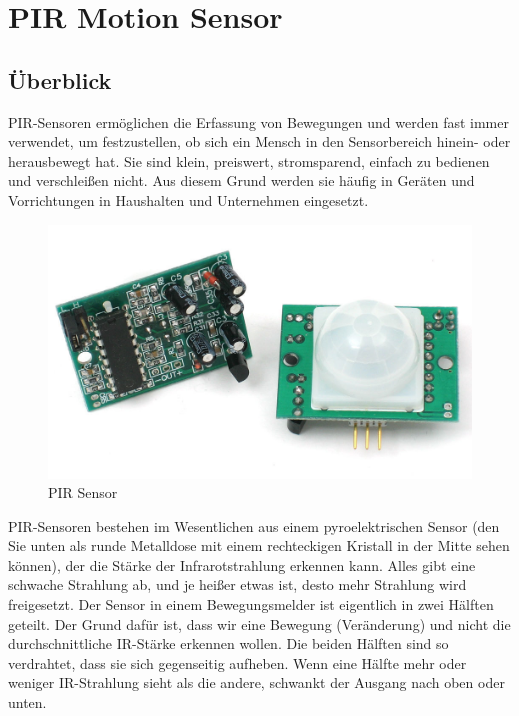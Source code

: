 \documentclass[conference]{IEEEtran}
\begin{document}
\section{PIR Motion Sensor}
\subsection{Überblick}
PIR-Sensoren ermöglichen die Erfassung von Bewegungen und werden fast immer verwendet, um festzustellen, ob sich ein Mensch in den Sensorbereich hinein- oder herausbewegt hat. Sie sind klein, preiswert, stromsparend, einfach zu bedienen und verschleißen nicht. Aus diesem Grund werden sie häufig in Geräten und Vorrichtungen in Haushalten und Unternehmen eingesetzt. 
	
\begin{figure}[h]
	\begin{center}
		\includegraphics[scale=0.15]{pir1}
	\end{center}
	\caption{PIR Sensor}
\end{figure}

PIR-Sensoren bestehen im Wesentlichen aus einem pyroelektrischen Sensor (den Sie unten als runde Metalldose mit einem rechteckigen Kristall in der Mitte sehen können), der die Stärke der Infrarotstrahlung erkennen kann. Alles gibt eine schwache Strahlung ab, und je heißer etwas ist, desto mehr Strahlung wird freigesetzt. Der Sensor in einem Bewegungsmelder ist eigentlich in zwei Hälften geteilt. Der Grund dafür ist, dass wir eine Bewegung (Veränderung) und nicht die durchschnittliche IR-Stärke erkennen wollen. Die beiden Hälften sind so verdrahtet, dass sie sich gegenseitig aufheben. Wenn eine Hälfte mehr oder weniger IR-Strahlung sieht als die andere, schwankt der Ausgang nach oben oder unten.
\end{document}
